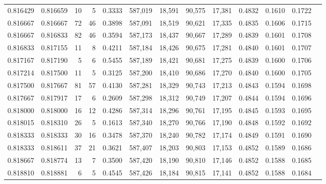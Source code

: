 \begin{tabular}{rrrrrrrrrrrrr}
0.816429 & 0.816659 &    10 &   5 &                                     0.3333 & 587,019 &  18,591 &  90,575 &  17,381 & 0.4832 & 0.1610 & 0.1722 \\
0.816667 & 0.816667 &    72 &  46 &                                     0.3898 & 587,091 &  18,519 &  90,621 &  17,335 & 0.4835 & 0.1606 & 0.1715 \\
0.816667 & 0.816833 &    82 &  46 &                                     0.3594 & 587,173 &  18,437 &  90,667 &  17,289 & 0.4839 & 0.1601 & 0.1708 \\
0.816833 & 0.817155 &    11 &   8 &                                     0.4211 & 587,184 &  18,426 &  90,675 &  17,281 & 0.4840 & 0.1601 & 0.1707 \\
0.817167 & 0.817190 &     5 &   6 &                                     0.5455 & 587,189 &  18,421 &  90,681 &  17,275 & 0.4839 & 0.1600 & 0.1706 \\
0.817214 & 0.817500 &    11 &   5 &                                     0.3125 & 587,200 &  18,410 &  90,686 &  17,270 & 0.4840 & 0.1600 & 0.1705 \\
0.817500 & 0.817667 &    81 &  57 &                                     0.4130 & 587,281 &  18,329 &  90,743 &  17,213 & 0.4843 & 0.1594 & 0.1698 \\
0.817667 & 0.817917 &    17 &   6 &                                     0.2609 & 587,298 &  18,312 &  90,749 &  17,207 & 0.4844 & 0.1594 & 0.1696 \\
0.818000 & 0.818000 &    16 &  12 &                                     0.4286 & 587,314 &  18,296 &  90,761 &  17,195 & 0.4845 & 0.1593 & 0.1695 \\
0.818015 & 0.818310 &    26 &   5 &                                     0.1613 & 587,340 &  18,270 &  90,766 &  17,190 & 0.4848 & 0.1592 & 0.1692 \\
0.818333 & 0.818333 &    30 &  16 &                                     0.3478 & 587,370 &  18,240 &  90,782 &  17,174 & 0.4849 & 0.1591 & 0.1690 \\
0.818333 & 0.818611 &    37 &  21 &                                     0.3621 & 587,407 &  18,203 &  90,803 &  17,153 & 0.4852 & 0.1589 & 0.1686 \\
0.818667 & 0.818774 &    13 &   7 &                                     0.3500 & 587,420 &  18,190 &  90,810 &  17,146 & 0.4852 & 0.1588 & 0.1685 \\
0.818810 & 0.818881 &     6 &   5 &                                     0.4545 & 587,426 &  18,184 &  90,815 &  17,141 & 0.4852 & 0.1588 & 0.1684 \\

\end{tabular}
